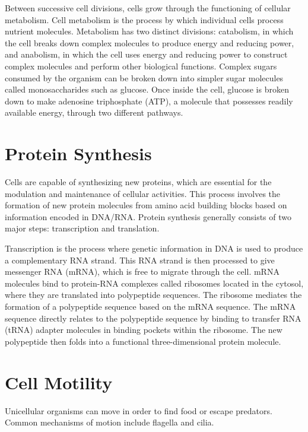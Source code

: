 Between successive cell divisions, cells grow through the functioning of cellular metabolism. Cell metabolism is the process by which individual cells process nutrient molecules. Metabolism has two distinct divisions: catabolism, in which the cell breaks down complex molecules to produce energy and reducing power, and anabolism, in which the cell uses energy and reducing power to construct complex molecules and perform other biological functions. Complex sugars consumed by the organism can be broken down into simpler sugar molecules called monosaccharides such as glucose. Once inside the cell, glucose is broken down to make adenosine triphosphate (ATP), a molecule that possesses readily available energy, through two different pathways.

\hypertarget{protein-synthesis}{%
\section{Protein Synthesis}\label{protein-synthesis}}

Cells are capable of synthesizing new proteins, which are essential for the modulation and maintenance of cellular activities. This process involves the formation of new protein molecules from amino acid building blocks based on information encoded in DNA/RNA. Protein synthesis generally consists of two major steps: transcription and translation.

Transcription is the process where genetic information in DNA is used to produce a complementary RNA strand. This RNA strand is then processed to give messenger RNA (mRNA), which is free to migrate through the cell. mRNA molecules bind to protein-RNA complexes called ribosomes located in the cytosol, where they are translated into polypeptide sequences. The ribosome mediates the formation of a polypeptide sequence based on the mRNA sequence. The mRNA sequence directly relates to the polypeptide sequence by binding to transfer RNA (tRNA) adapter molecules in binding pockets within the ribosome. The new polypeptide then folds into a functional three-dimensional protein molecule.

\hypertarget{cell-motility}{%
\section{Cell Motility}\label{cell-motility}}

Unicellular organisms can move in order to find food or escape predators. Common mechanisms of motion include flagella and cilia.

